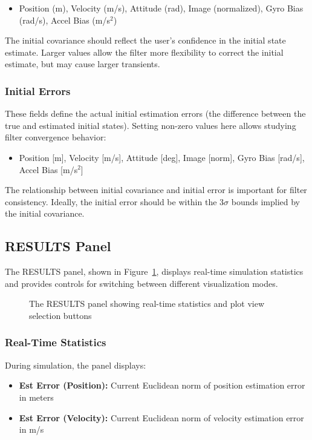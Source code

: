 \documentclass[11pt,a4paper]{article}
\begin{document}
\begin{itemize}
    \item Position (m), Velocity (m/s), Attitude (rad), Image (normalized), Gyro Bias (rad/s), Accel Bias (m/s$^2$)
\end{itemize}

The initial covariance should reflect the user's confidence in the initial state estimate. Larger values allow the filter more flexibility to correct the initial estimate, but may cause larger transients.

\subsubsection{Initial Errors}
These fields define the actual initial estimation errors (the difference between the true and estimated initial states). Setting non-zero values here allows studying filter convergence behavior:

\begin{itemize}
    \item Position [m], Velocity [m/s], Attitude [deg], Image [norm], Gyro Bias [rad/s], Accel Bias [m/s$^2$]
\end{itemize}

The relationship between initial covariance and initial error is important for filter consistency. Ideally, the initial error should be within the $3\sigma$ bounds implied by the initial covariance.

\subsection{RESULTS Panel}

The RESULTS panel, shown in Figure~\ref{fig:results_panel}, displays real-time simulation statistics and provides controls for switching between different visualization modes.

\begin{figure}[h]
    \centering
    \caption{The RESULTS panel showing real-time statistics and plot view selection buttons}
    \label{fig:results_panel}
\end{figure}

\subsubsection{Real-Time Statistics}
During simulation, the panel displays:
\begin{itemize}
    \item \textbf{Est Error (Position):} Current Euclidean norm of position estimation error in meters
    \item \textbf{Est Error (Velocity):} Current Euclidean norm of velocity estimation error in m/s
\end{itemize}
\end{document}
